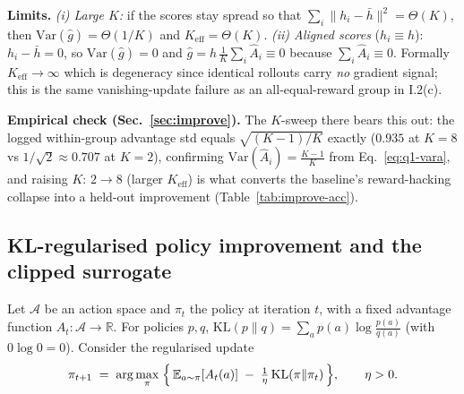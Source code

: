 \documentclass[11pt,a4paper]{article}
\begin{document}
\smallskip\noindent\textbf{Limits.} \emph{(i) Large $K$:} if the scores stay spread so that
$\sum_i\lVert h_i-\bar h\rVert^2=\Theta(K)$, then $\mathrm{Var}(\hat g)=\Theta(1/K)$ and
$K_{\mathrm{eff}}=\Theta(K)$. \emph{(ii) Aligned scores}
($h_i\equiv h$): $h_i-\bar h=0$, so $\mathrm{Var}(\hat g)=0$ and 
$\hat g=h\,\tfrac1K\sum_i\hat A_i\equiv0$ because $\sum_i\hat A_i\equiv0$. Formally
$K_{\mathrm{eff}}\to\infty$ which is degeneracy since identical rollouts carry
\emph{no} gradient signal; this is the same vanishing-update failure as an all-equal-reward group in
I.2(c).

\smallskip\noindent\textbf{Empirical check (Sec.~\ref{sec:improve}).} The $K$-sweep there
bears this out: the logged within-group advantage std equals $\sqrt{(K{-}1)/K}$ exactly
($0.935$ at $K{=}8$ vs $1/\sqrt2{\approx}0.707$ at $K{=}2$), confirming
$\mathrm{Var}(\hat A_i)=\tfrac{K-1}{K}$ from Eq.~\eqref{eq:q1-vara}, and raising $K{:}\,2{\to}8$
(larger $K_{\mathrm{eff}}$) is what converts the baseline's reward-hacking collapse into a
held-out improvement (Table~\ref{tab:improve-acc}).

\newpage
\subsection{KL-regularised policy improvement and the clipped surrogate}
\label{sec:theory-q2}
Let $\mathcal{A}$ be an action space and $\pi_t$ the policy at iteration $t$, with
a fixed advantage function $A_t:\mathcal{A}\to\mathbb{R}$. For policies $p,q$,
$\mathrm{KL}(p\|q)=\sum_a p(a)\log\frac{p(a)}{q(a)}$ (with $0\log 0=0$).
Consider the regularised update
\begin{equation}
  \pi_{t+1} \;=\; \arg\max_{\pi}\;
  \Bigl\{\, \mathbb{E}_{a\sim\pi}[A_t(a)] \;-\; \tfrac{1}{\eta}\,\mathrm{KL}(\pi\|\pi_t) \,\Bigr\},
  \qquad \eta>0.
  \label{eq:q2-update}
\end{equation}
\end{document}
